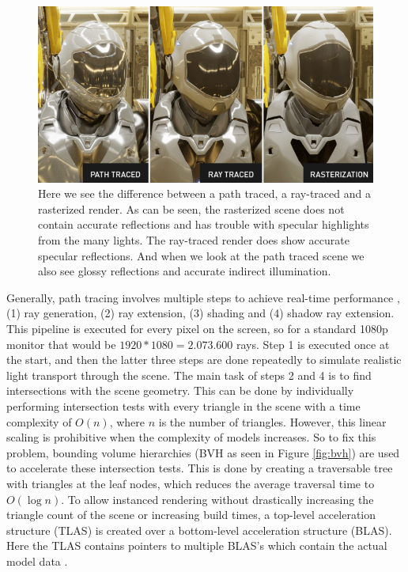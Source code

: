 \begin{figure}
    \centering
    \includegraphics[width=\linewidth]{figures/nvidia_ray_path_rasterization.png}
    \caption{Here we see the difference between a path traced, a ray-traced and a rasterized render. As can be seen, the rasterized scene does not contain accurate reflections and has trouble with specular highlights from the many lights. The ray-traced render does show accurate specular reflections. And when we look at the path traced scene we also see glossy reflections and accurate indirect illumination. \cite{NVIDIAPathRayRaster}}
    \label{fig:path_ray_raster}
\end{figure}

Generally, path tracing involves multiple steps to achieve real-time performance \cite{laine2013megakernels}, (1) ray generation, (2) ray extension, (3) shading and (4) shadow ray extension. This pipeline is executed for every pixel on the screen, so for a standard 1080p monitor that would be $1920*1080=2.073.600$ rays. Step 1 is executed once at the start, and then the latter three steps are done repeatedly to simulate realistic light transport through the scene. The main task of steps 2 and 4 is to find intersections with the scene geometry. This can be done by individually performing intersection tests with every triangle in the scene with a time complexity of $O(n)$, where $n$ is the number of triangles. However, this linear scaling is prohibitive when the complexity of models increases. So to fix this problem, bounding volume hierarchies (BVH as seen in Figure \ref{fig:bvh}) are used to accelerate these intersection tests. This is done by creating a traversable tree with triangles at the leaf nodes, which reduces the average traversal time to  $O(\log n)$. To allow instanced rendering without drastically increasing the triangle count of the scene or increasing build times, a top-level acceleration structure (TLAS) is created over a bottom-level acceleration structure (BLAS). Here the TLAS contains pointers to multiple BLAS's which contain the actual model data \cite{VulkanAccelerationStructures}.


